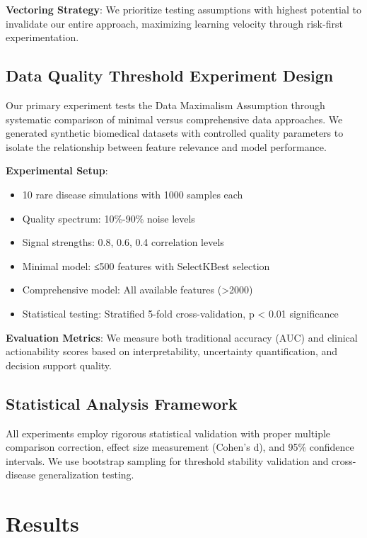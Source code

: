 \documentclass{article}
\begin{document}
\textbf{Vectoring Strategy}: We prioritize testing assumptions with highest potential to invalidate our entire approach, maximizing learning velocity through risk-first experimentation.

\subsection{Data Quality Threshold Experiment Design}

Our primary experiment tests the Data Maximalism Assumption through systematic comparison of minimal versus comprehensive data approaches. We generated synthetic biomedical datasets with controlled quality parameters to isolate the relationship between feature relevance and model performance.

\textbf{Experimental Setup}:
\begin{itemize}
\item 10 rare disease simulations with 1000 samples each
\item Quality spectrum: 10\%-90\% noise levels 
\item Signal strengths: 0.8, 0.6, 0.4 correlation levels
\item Minimal model: ≤500 features with SelectKBest selection
\item Comprehensive model: All available features (>2000)
\item Statistical testing: Stratified 5-fold cross-validation, p < 0.01 significance
\end{itemize}

\textbf{Evaluation Metrics}: We measure both traditional accuracy (AUC) and clinical actionability scores based on interpretability, uncertainty quantification, and decision support quality.

\subsection{Statistical Analysis Framework}

All experiments employ rigorous statistical validation with proper multiple comparison correction, effect size measurement (Cohen's d), and 95\% confidence intervals. We use bootstrap sampling for threshold stability validation and cross-disease generalization testing.

\section{Results}
\end{document}
